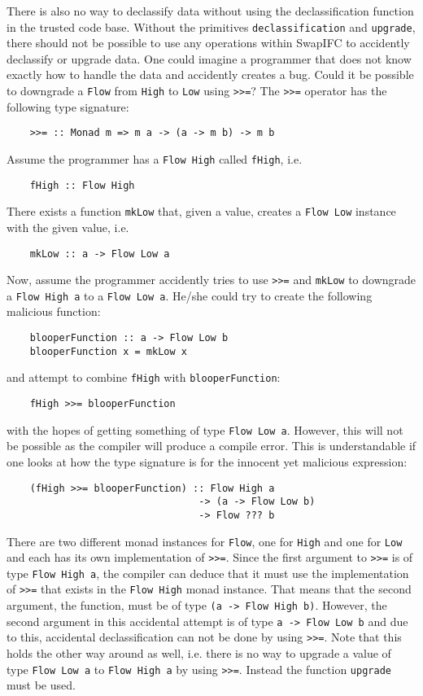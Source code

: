 There is also no way to declassify data without using the declassification function in the trusted code base. Without the primitives {\tt declassification} and {\tt upgrade}, there should not be possible to use any operations within SwapIFC to accidently declassify or upgrade data. One could imagine a programmer that does not know exactly how to handle the data and accidently creates a bug. Could it be possible to downgrade a {\tt Flow} from {\tt High} to {\tt Low} using {\tt >>=}? The {\tt >>=} operator has the following type signature:
\begin{verbatim}
    >>= :: Monad m => m a -> (a -> m b) -> m b
\end{verbatim}
Assume the programmer has a {\tt Flow High} called {\tt fHigh}, i.e.
\begin{verbatim}
    fHigh :: Flow High
\end{verbatim}
There exists a function {\tt mkLow} that, given a value, creates a {\tt Flow Low} instance with the given value, i.e.
\begin{verbatim}
    mkLow :: a -> Flow Low a
\end{verbatim}
Now, assume the programmer accidently tries to use {\tt >>=} and {\tt mkLow} to downgrade a {\tt Flow High a} to a {\tt Flow Low a}. He/she could try to create the following malicious function:
\begin{verbatim}
    blooperFunction :: a -> Flow Low b
    blooperFunction x = mkLow x
\end{verbatim}
and attempt to combine {\tt fHigh} with {\tt blooperFunction}:
\begin{verbatim}
    fHigh >>= blooperFunction
\end{verbatim}
with the hopes of getting something of type {\tt Flow Low a}. However, this will not be possible as the compiler will produce a compile error. This is understandable if one looks at how the type signature is for the innocent yet malicious expression:
\begin{verbatim}
    (fHigh >>= blooperFunction) :: Flow High a
                                 -> (a -> Flow Low b)
                                 -> Flow ??? b
\end{verbatim}
There are two different monad instances for {\tt Flow}, one for {\tt High} and one for {\tt Low} and each has its own implementation of {\tt >>=}. Since the first argument to {\tt >>=} is of type {\tt Flow High a}, the compiler can deduce that it must use the implementation of {\tt >>=} that exists in the {\tt Flow High} monad instance. That means that the second argument, the function, must be of type {\tt (a -> Flow High b)}. However, the second argument in this accidental attempt is of type {\tt a -> Flow Low b} and due to this, accidental declassification can not be done by using {\tt >>=}. Note that this holds the other way around as well, i.e. there is no way to upgrade a value of type {\tt Flow Low a} to {\tt Flow High a} by using {\tt >>=}. Instead the function {\tt upgrade} must be used.

